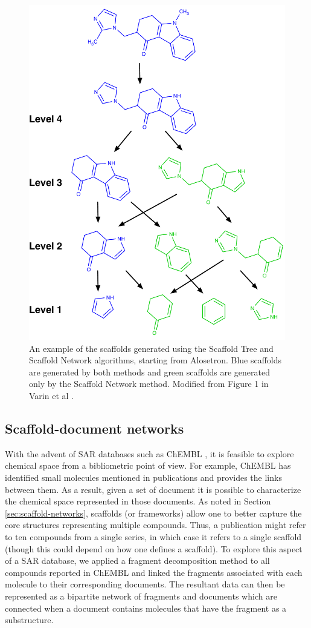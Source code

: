 \documentclass[]{book}
\begin{document}
\begin{figure}[h]
  \centering
  \includegraphics[width=0.75\linewidth]{img/scaffold-network}
  \caption{An example of the scaffolds generated using
  the Scaffold Tree and Scaffold Network algorithms, starting from
  Alosetron. Blue scaffolds are generated by both methods and green
  scaffolds are generated only by the Scaffold Network
  method. Modified from Figure 1 in Varin et al \cite{Varin:2011ve}.}
  \label{fig:scaffnet}
\end{figure}

\subsection{Scaffold-document networks}
\label{sec:scaff-docum-netw}

With the advent of SAR databases such as ChEMBL \cite{Gaulton:2012jl},
it is feasible to explore chemical space from a bibliometric point of
view. For example, ChEMBL has identified small molecules mentioned in
publications and provides the links between them. As a result, given a
set of document it is possible to characterize the chemical space
represented in those documents. As noted in Section
\ref{sec:scaffold-networks}, scaffolds (or frameworks) allow one to
better capture the core structures representing multiple
compounds. Thus, a publication might refer to ten compounds from a
single series, in which case it refers to a single scaffold (though
this could depend on how one defines a scaffold). To explore this
aspect of a SAR database, we applied a fragment decomposition method
to all compounds reported in ChEMBL and linked the fragments
associated with each molecule to their corresponding documents. The
resultant data can then be represented as a bipartite network of
fragments and documents which are connected when a document contains
molecules that have the fragment as a substructure. 
\end{document}
